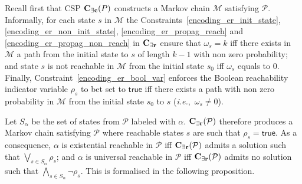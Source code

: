 \documentclass{llncs}
\newcommand{\csp}{\textnormal{CSP}}
\newcommand{\Mec} {\ensuremath{{\bf C_{{\exists}c}}}}
\newcommand{\Mer}{\ensuremath{{\bf C_{{\exists}r}}}}
\newcommand{\ie} {{\em i.e.},\ }
\newcommand{\ttransition}[1]{\ensuremath{\theta_{#1}}}
\newcommand{\transition}[2]{\ensuremath{\ttransition{#1}^{#2}}}
\newcommand{\Pred}{\ensuremath{{\tt{Pred}}}}
\newcommand{\true}             {\ensuremath{\mathsf{true}}}
\newcommand{\comment}[2]{{\color{gray}{\small{\underline{#1:} #2}}}}
\newcommand{\benoit}[1]{\marginpar{\comment{Beno\^it}{#1}}}%
\begin{document}
\smallskip


Recall first that {\csp} $\Mec(P)$ constructs a Markov chain $\mathcal{M}$ satisfying $\mathcal{P}$.
Informally, for each state $s$ in $\mathcal{M}$ the Constraints~\ref{encoding_er_init_state}, \ref{encoding_er_non_init_state}, \ref{encoding_er_propag_reach} and \ref{encoding_er_propag_non_reach} in $\Mer$ ensure that
$\omega_s = k$ iff there exists in $\mathcal{M}$
a path from the initial state to $s$ of length $k-1$ with non zero probability;
and state $s$ is not reachable in $\mathcal{M}$ from the initial state $s_0$ iff $\omega_s$ equals to $0$. Finally, Constraint~\ref{encoding_er_bool_var} enforces the Boolean reachability indicator variable $\rho_s$
to bet set to {\true} iff there exists a path with non zero probability in $\mathcal{M}$ 
from the initial state $s_0$ to $s$ (\ie $\omega_s \neq
0$).

Let $S_\alpha$ be the set of states from $\mathcal{P}$ labeled with $\alpha$.
$\Mer(\mathcal{P})$ therefore produces a Markov chain satisfying
$\mathcal{P}$ where reachable states $s$ are such that $\rho_s =
\true$.
As a consequence, $\alpha$ is existential reachable in
$\mathcal{P}$ iff $\Mer(\mathcal{P})$ admits a solution such that
$\bigvee_{s \in S_\alpha} \rho_s$; and $\alpha$ is universal reachable in
$\mathcal{P}$ iff $\Mer(\mathcal{P})$ admits no solution such that
$\bigwedge_{s \in S_\alpha} \neg\rho_s$. This is formalised in the following
proposition.
\end{document}
